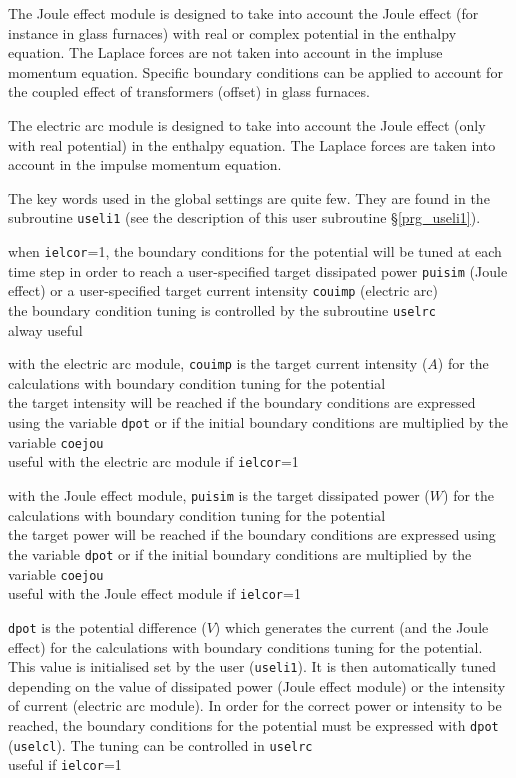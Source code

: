 The Joule effect module is designed to take into account the Joule effect
(for instance in glass furnaces) with real or complex potential in the
enthalpy equation. The Laplace forces are not taken into account in the
impluse momentum equation. Specific boundary conditions can be applied to
account for the coupled effect of transformers (offset) in glass furnaces.

The electric arc module is designed to take into account the Joule effect
(only with real potential) in the enthalpy equation. The Laplace forces
are taken into account in the impulse momentum equation.

The key words used in the global settings are quite few. They are
found in the subroutine \texttt{useli1} (see the description of this
user subroutine \S\ref{prg_useli1}).

{when \texttt{ielcor}=1, the boundary conditions for the potential will be
tuned at each time step in order to reach a user-specified target dissipated
power \texttt{puisim} (Joule effect) or a user-specified target current
intensity \texttt{couimp} (electric arc)\\
the boundary condition tuning is controlled by the subroutine \texttt{uselrc}\\
alway useful}

{with the electric arc module, \texttt{couimp} is the target current intensity ($A$)
for the calculations with boundary condition tuning for the potential\\
the target intensity will be reached if the boundary conditions are expressed
using the variable \texttt{dpot} or if the initial boundary conditions are multiplied by
the variable \texttt{coejou}\\
useful with the electric arc module if \texttt{ielcor}=1}

{with the Joule effect module, \texttt{puisim} is the target dissipated power ($W$)
for the calculations with boundary condition tuning for the potential\\
the target power will be reached if the boundary conditions are expressed
using the variable \texttt{dpot} or if the initial boundary conditions are multiplied by
the variable \texttt{coejou}\\
useful with the Joule effect module if \texttt{ielcor}=1}

{\texttt{dpot} is the potential difference ($V$) which generates the current (and the Joule effect) for the
calculations with boundary conditions tuning for the potential. This value is
initialised set by the user (\texttt{useli1}). It is then automatically tuned
depending on the value of dissipated power (Joule effect module) or the
intensity of current (electric arc module).
In order for the correct power or intensity to be reached, the boundary
conditions for the potential must be expressed with \texttt{dpot}
(\texttt{uselcl}). The tuning can be controlled in \texttt{uselrc}\\
useful if \texttt{ielcor}=1}

